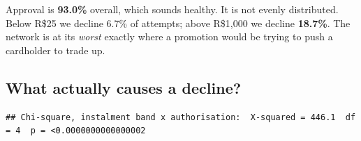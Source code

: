 \documentclass[
]{article}
\newenvironment{Shaded}{\begin{snugshade}}{\end{snugshade}}
\newcommand{\AttributeTok}[1]{\textcolor[rgb]{0.13,0.29,0.53}{#1}}
\newcommand{\DecValTok}[1]{\textcolor[rgb]{0.00,0.00,0.81}{#1}}
\newcommand{\FunctionTok}[1]{\textcolor[rgb]{0.13,0.29,0.53}{\textbf{#1}}}
\newcommand{\NormalTok}[1]{#1}
\newcommand{\OtherTok}[1]{\textcolor[rgb]{0.56,0.35,0.01}{#1}}
\newcommand{\SpecialCharTok}[1]{\textcolor[rgb]{0.81,0.36,0.00}{\textbf{#1}}}
\newcommand{\StringTok}[1]{\textcolor[rgb]{0.31,0.60,0.02}{#1}}
\begin{document}
Approval is \textbf{93.0\%} overall, which sounds healthy. It is not
evenly distributed. Below R\$25 we decline 6.7\% of attempts; above
R\$1,000 we decline \textbf{18.7\%}. The network is at its \emph{worst}
exactly where a promotion would be trying to push a cardholder to trade
up.

\subsection{What actually causes a
decline?}\label{what-actually-causes-a-decline}

\begin{Shaded}
\end{Shaded}

\begin{verbatim}
## Chi-square, instalment band x authorisation:  X-squared = 446.1  df = 4  p = <0.0000000000000002
\end{verbatim}
\end{document}
